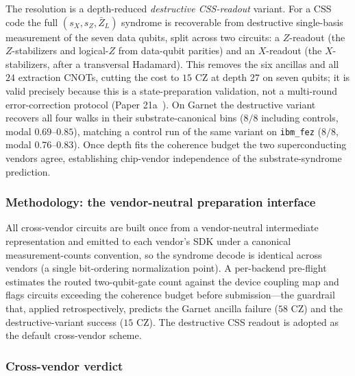 \documentclass[11pt]{article}
\newcommand{\barZ}{\bar Z_L}
\begin{document}
The resolution is a depth-reduced \emph{destructive CSS-readout} variant.  For a CSS code the full $(s_X, s_Z, \barZ)$ syndrome is recoverable from destructive single-basis measurement of the seven data qubits, split across two circuits: a $Z$-readout (the $Z$-stabilizers and logical-$Z$ from data-qubit parities) and an $X$-readout (the $X$-stabilizers, after a transversal Hadamard).  This removes the six ancillas and all $24$ extraction CNOTs, cutting the cost to $15$ CZ at depth $27$ on seven qubits; it is valid precisely because this is a state-preparation validation, not a multi-round error-correction protocol (Paper 21a~\cite[\S 5.4]{Paper21a}).  On Garnet the destructive variant recovers all four walks in their substrate-canonical bins ($8/8$ including controls, modal $0.69$--$0.85$), matching a control run of the same variant on \texttt{ibm\_fez} ($8/8$, modal $0.76$--$0.83$).  Once depth fits the coherence budget the two superconducting vendors agree, establishing chip-vendor independence of the substrate-syndrome prediction.

\subsubsection{Methodology: the vendor-neutral preparation interface}
\label{sec:phase28e-interface}

All cross-vendor circuits are built once from a vendor-neutral intermediate representation and emitted to each vendor's SDK under a canonical measurement-counts convention, so the syndrome decode is identical across vendors (a single bit-ordering normalization point).  A per-backend pre-flight estimates the routed two-qubit-gate count against the device coupling map and flags circuits exceeding the coherence budget before submission---the guardrail that, applied retrospectively, predicts the Garnet ancilla failure ($58$ CZ) and the destructive-variant success ($15$ CZ).  The destructive CSS readout is adopted as the default cross-vendor scheme.

\subsubsection{Cross-vendor verdict}
\label{sec:phase28e-verdict}
\end{document}
